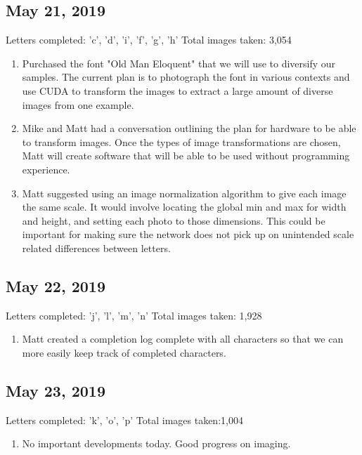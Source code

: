 \documentclass[12pt]{article} %
\begin{document}
\subsection{May 21, 2019}
Letters completed: 'c', 'd', 'i', 'f', 'g', 'h'\newline
Total images taken: 3,054\newline
\noindent\makebox[\linewidth]{\rule{15cm}{0.4pt}}
\begin{enumerate}[label = (\roman*)]
\item Purchased the font "Old Man Eloquent" that we will use to diversify our samples. The current plan is to photograph the font in various contexts and use CUDA to transform the images to extract a large amount of diverse images from one example.
\item Mike and Matt had a conversation outlining the plan for hardware to be able to transform images. Once the types of image transformations are chosen, Matt will create software that will be able to be used without programming experience.
\item Matt suggested using an image normalization algorithm to give each image the same scale. It would involve locating the global min and max for width and height, and setting each photo to those dimensions. This could be important for making sure the network does not pick up on unintended scale related differences between letters.
\end{enumerate}

\subsection{May 22, 2019}
Letters completed: 'j', 'l', 'm', 'n'\newline
Total images taken: 1,928 \newline
\noindent\makebox[\linewidth]{\rule{15cm}{0.4pt}}
\begin{enumerate}[label = (\roman*)]
\item Matt created a completion log complete with all characters so that we can more easily keep track of completed characters.
\end{enumerate}

\subsection{May 23, 2019}
Letters completed: 'k', 'o', 'p'\newline
Total images taken:1,004\newline
\noindent\makebox[\linewidth]{\rule{15cm}{0.4pt}}
\begin{enumerate}[label = (\roman*)]
\item No important developments today. Good progress on imaging.
\end{enumerate}
\end{document}
